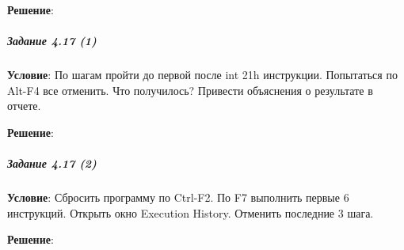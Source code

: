 \textbf{Решение}:



\subparagraph{Задание 4.17 (1)}

\textbf{Условие}:
По шагам пройти до первой после int 21h инструкции. Попытаться по Alt-F4 все отменить. Что получилось? Привести объяснения о результате в отчете.

\textbf{Решение}:



\subparagraph{Задание 4.17 (2)}

\textbf{Условие}:
Сбросить программу по Ctrl-F2. По F7 выполнить первые 6 инструкций. Открыть окно Execution History. Отменить последние 3 шага.

\textbf{Решение}:


